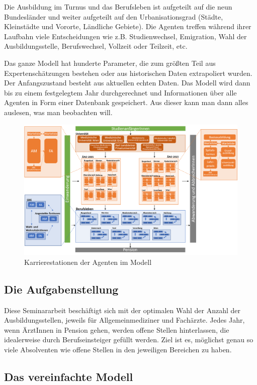 \documentclass[a4paper,12pt]{article}
\begin{document}
Die Ausbildung im Turnus und das Berufsleben ist aufgeteilt auf die neun Bundesländer und weiter aufgeteilt auf den Urbanisationsgrad (Städte, Kleinstädte und Vororte, Ländliche Gebiete). Die Agenten treffen während ihrer Laufbahn viele Entscheidungen wie z.B. Studienwechsel, Emigration, Wahl der Ausbildungsstelle, Berufswechsel, Vollzeit oder Teilzeit, etc. 

Das ganze Modell hat hunderte Parameter, die zum größten Teil aus Expertenschätzungen bestehen oder aus historischen Daten extrapoliert wurden. Der Anfangszustand besteht aus aktuellen echten Daten. Das Modell wird dann bis zu einem festgelegtem Jahr durchgerechnet und Informationen über alle Agenten in Form einer Datenbank gespeichert. Aus dieser kann man dann alles auslesen, was man beobachten will.

\begin{figure}[h]
\includegraphics[width=\textwidth]{modellgraph.png}
\caption{Karrierestationen der Agenten im Modell}
\end{figure}


\subsection{Die Aufgabenstellung}

Diese Seminararbeit beschäftigt sich mit der optimalen Wahl der Anzahl der Ausbildungsstellen, jeweils für Allgemeinmediziner und Fachärzte. Jedes Jahr, wenn ÄrztInnen in Pension gehen, werden offene Stellen hinterlassen, die idealerweise durch Berufseinsteiger gefüllt werden. Ziel ist es, möglichst genau so viele Absolventen wie offene Stellen in den jeweiligen Bereichen zu haben.

\subsection{Das vereinfachte Modell}
\end{document}
